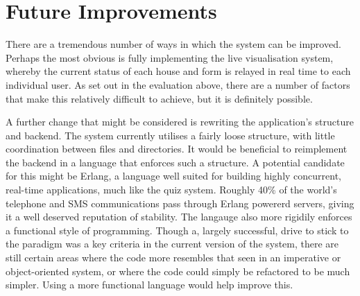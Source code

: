 \section{Future Improvements} %
\label{sec:future_improvements}
There are a tremendous number of ways in which the system can be improved. Perhaps the most obvious is fully implementing the live visualisation system, whereby the current status of each house and form is relayed in real time to each individual user. As set out in the evaluation above, there are a number of factors that make this relatively difficult to achieve, but it is definitely possible.

A further change that might be considered is rewriting the application's structure and backend. The system currently utilises a fairly loose structure, with little coordination between files and directories. It would be beneficial to reimplement the backend in a language that enforces such a structure. A potential candidate for this might be Erlang, a language well suited for building highly concurrent, real-time applications, much like the quiz system. Roughly 40\% of the world's telephone and SMS communications pass through Erlang powererd servers, giving it a well deserved reputation of stability. The langauge also more rigidily enforces a functional style of programming. Though a, largely successful, drive to stick to the paradigm was a key criteria in the current version of the system, there are still certain areas where the code more resembles that seen in an imperative or object-oriented system, or where the code could simply be refactored to be much simpler. Using a more functional language would help improve this.
